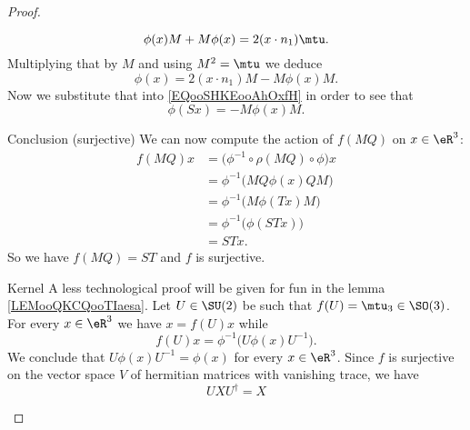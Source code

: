 \begin{proof}
\begin{subproof}
\begin{subproof}
\begin{equation}
                        \phi(x)M+M\phi(x)=2(x\cdot n_1)\mtu.
                    \end{equation}
                    Multiplying that by \( M\) and using \( M^2=\mtu\) we deduce
                    \begin{equation}
                        \phi(x)=2(x\cdot n_1)M-M\phi(x)M.
                    \end{equation}
                    Now we substitute that into \eqref{EQooSHKEooAhOxfH} in order to see that
                    \begin{equation}
                        \phi(Sx)=-M\phi(x)M.
                    \end{equation}
                \item[Conclusion (surjective)]
                    We can now compute the action of \( f(MQ)\) on \( x\in \eR^3\):
                    \begin{subequations}
                        \begin{align}
                            f(MQ)x&=\big( \phi^{-1}\circ\rho(MQ)\circ\phi \big)x\\
                            &=\phi^{-1}\big( MQ\phi(x)QM \big)\\
                            &=\phi^{-1}\big( M\phi(Tx)M \big)\\
                            &=\phi^{-1}\big( \phi(STx) \big)\\
                            &=STx.
                        \end{align}
                    \end{subequations}
                    So we have \( f(MQ)=ST\) and \( f\) is surjective.
            \end{subproof}
        \item[Kernel]
            A less technological proof will be given for fun in the lemma \ref{LEMooQKCQooTIaesa}.
            Let \( U\in \SU(2)\) be such that \( f(U)=\mtu_3\in \SO(3)\). For every \( x\in \eR^3\) we have \( x=f(U)x\) while
            \begin{equation}
                f(U)x=\phi^{-1}\big( U\phi(x)U^{-1} \big).
            \end{equation}
            We conclude that \( U\phi(x)U^{-1}=\phi(x)\) for every \( x\in \eR^3\). Since \( f\) is surjective on the vector space \( V\) of hermitian matrices with vanishing trace, we have
            \begin{equation}
                UXU^{\dag}=X
            \end{equation}

\end{subproof}
\end{proof}

